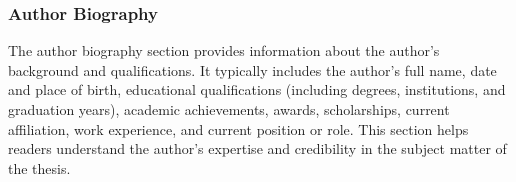 \subsubsection{Author Biography}

The author biography section provides information about the author's background and qualifications. It typically includes the author's full name, date and place of birth, educational qualifications (including degrees, institutions, and graduation years), academic achievements, awards, scholarships, current affiliation, work experience, and current position or role. This section helps readers understand the author's expertise and credibility in the subject matter of the thesis.